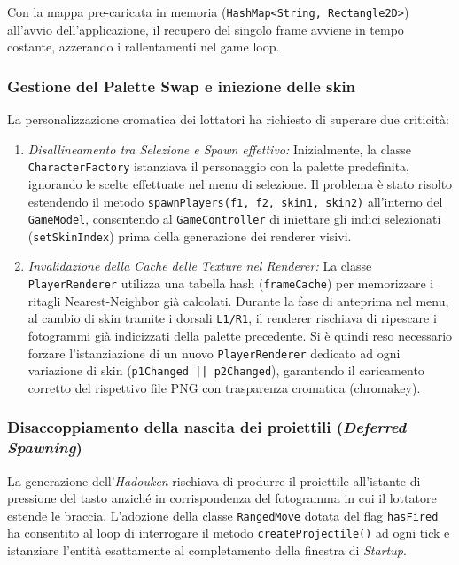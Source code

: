 \documentclass[11pt, a4paper]{article}
\begin{document}
Con la mappa pre-caricata in memoria (\texttt{HashMap<String, Rectangle2D>}) all'avvio dell'applicazione, il recupero del singolo frame avviene in tempo costante, azzerando i rallentamenti nel game loop.

\subsubsection{Gestione del Palette Swap e iniezione delle skin}
    La personalizzazione cromatica dei lottatori ha richiesto di superare due criticità:
    \begin{enumerate}
    \item \emph{Disallineamento tra Selezione e Spawn effettivo:} Inizialmente, la classe \texttt{CharacterFactory} istanziava il personaggio con la palette predefinita, ignorando le scelte effettuate nel menu di selezione. Il problema è stato risolto estendendo il metodo \texttt{spawnPlayers(f1, f2, skin1, skin2)} all'interno del \texttt{GameModel}, consentendo al \texttt{GameController} di iniettare gli indici selezionati (\texttt{setSkinIndex}) prima della generazione dei renderer visivi.
    \item \emph{Invalidazione della Cache delle Texture nel Renderer:} La classe \texttt{PlayerRenderer} utilizza una tabella hash (\texttt{frameCache}) per memorizzare i ritagli Nearest-Neighbor già calcolati. Durante la fase di anteprima nel menu, al cambio di skin tramite i dorsali \texttt{L1/R1}, il renderer rischiava di ripescare i fotogrammi già indicizzati della palette precedente. Si è quindi reso necessario forzare l'istanziazione di un nuovo \texttt{PlayerRenderer} dedicato ad ogni variazione di skin (\texttt{p1Changed || p2Changed}), garantendo il caricamento corretto del rispettivo file PNG con trasparenza cromatica (chromakey).
    \end{enumerate}

\subsubsection{Disaccoppiamento della nascita dei proiettili (\emph{Deferred Spawning})}
	La generazione dell'\emph{Hadouken} rischiava di produrre il proiettile all'istante di pressione del tasto anziché in corrispondenza del fotogramma in cui il lottatore estende le braccia. L'adozione della classe \texttt{RangedMove} dotata del flag \texttt{hasFired} ha consentito al loop di interrogare il metodo \texttt{createProjectile()} ad ogni tick e istanziare l'entità esattamente al completamento della finestra di \emph{Startup}.
\end{document}
